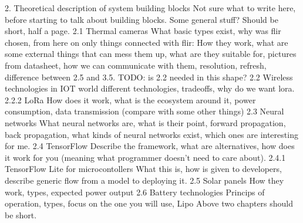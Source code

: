  2. Theoretical description of system building blocks
    Not sure what to write here, before starting to talk about building blocks. Some general stuff? Should be short, half a page.
    2.1 Thermal cameras
        What basic types exist, why was flir chosen, from here on only things connected with flir: How they work, what are some external things that can mess them up, what are they suitable for, pictures from datasheet, how we can communicate with them, resolution, refresh, difference between 2.5 and 3.5.
TODO: is 2.2 needed in this shape?
    2.2 Wireless technologies in IOT world
        different technologies, tradeoffs, why do we want lora. 
        2.2.2 LoRa 
            How does it work, what is the ecosystem around it, power consumption, data transmission (compare with some other things) 
    2.3 Neural networks
        What neural networks are, what is their point, forward propagation, back propagation, what kinds of neural networks exist, which ones are interesting for me.
    2.4 TensorFlow
        Describe the framework, what are alternatives, how does it work for you (meaning what programmer doesn't need to care about).
        2.4.1 TensorFlow Lite for microcontollers
            What this is, how is given to developers, describe generic flow from a model to deploying it.
    2.5 Solar panels
        How they work, types, expected power output
    2.6 Battery technologies
        Princips of operation, types, focus on the one you will use, Lipo 
    Above two chapters should be short.

